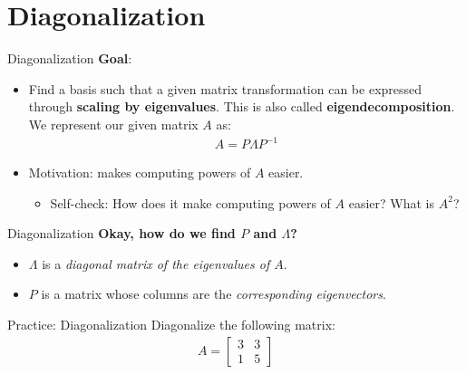 \section{Diagonalization}

\begin{frame}{Diagonalization}
    \textbf{Goal}:\\[-1ex]
    \begin{itemize}
        \item Find a basis such that a given matrix transformation can be expressed through \textbf{scaling by eigenvalues}. This is also called \textbf{eigendecomposition}. We represent our given matrix $A$ as:
        \begin{align*}
            A = P \Lambda P^{-1}
        \end{align*}
        \item Motivation: makes computing powers of $A$ easier.
        \begin{itemize} 
            \item Self-check: How does it make computing powers of $A$ easier? What is $A^2$?
        \end{itemize}
    \end{itemize}

\end{frame}

\begin{frame}{Diagonalization}
    \textbf{Okay, how do we find $P$ and $\Lambda$?}\\[-1ex]
    \begin{itemize}
        \item $\Lambda$ is a \textit{diagonal matrix of the eigenvalues of $A$}.
        \item $P$ is a matrix whose columns are the \textit{corresponding eigenvectors}.
    \end{itemize}
\end{frame}

\begin{frame}{Practice: Diagonalization}
    Diagonalize the following matrix:
    \begin{align*}
        A = \begin{bmatrix}
            3 & 3 \\
            1 & 5
        \end{bmatrix}
    \end{align*}
\end{frame}


